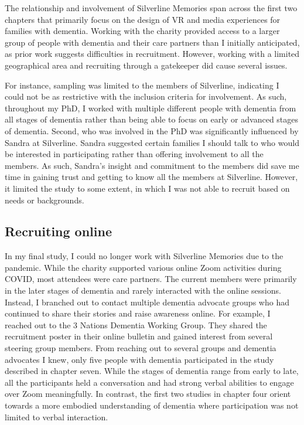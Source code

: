 The relationship and involvement of Silverline Memories span across the first two chapters that primarily focus on the design of VR and media experiences for families with dementia. Working with the charity provided access to a larger group of people with dementia and their care partners than I initially anticipated, as prior work suggests difficulties in recruitment. However, working with a limited geographical area and recruiting through a gatekeeper did cause several issues. 

For instance, sampling was limited to the members of Silverline, indicating I could not be as restrictive with the inclusion criteria for involvement. As such, throughout my PhD, I worked with multiple different people with dementia from all stages of dementia rather than being able to focus on early or advanced stages of dementia. Second, who was involved in the PhD was significantly influenced by Sandra at Silverline. Sandra suggested certain families I should talk to who would be interested in participating rather than offering involvement to all the members. As such, Sandra's insight and commitment to the members did save me time in gaining trust and getting to know all the members at Silverline. However, it limited the study to some extent, in which I was not able to recruit based on needs or backgrounds.  

\subsection{Recruiting online}
\label{Method:RecruitOnline}
In my final study, I could no longer work with Silverline Memories due to the pandemic. While the charity supported various online Zoom activities during COVID, most attendees were care partners. The current members were primarily in the later stages of dementia and rarely interacted with the online sessions. Instead, I branched out to contact multiple dementia advocate groups who had continued to share their stories and raise awareness online. For example, I reached out to the 3 Nations Dementia Working Group. They shared the recruitment poster in their online bulletin and gained interest from several steering group members. From reaching out to several groups and dementia advocates I knew, only five people with dementia participated in the study described in chapter seven. While the stages of dementia range from early to late, all the participants held a conversation and had strong verbal abilities to engage over Zoom meaningfully. In contrast, the first two studies in chapter four orient towards a more embodied understanding of dementia where participation was not limited to verbal interaction.

